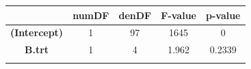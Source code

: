 \documentclass[]{article}
\begin{document}
\begin{longtable}[]{@{}ccccc@{}}
\toprule
\begin{minipage}[b]{0.29\columnwidth}\centering\strut
~\strut
\end{minipage} & \begin{minipage}[b]{0.10\columnwidth}\centering\strut
numDF\strut
\end{minipage} & \begin{minipage}[b]{0.10\columnwidth}\centering\strut
denDF\strut
\end{minipage} & \begin{minipage}[b]{0.12\columnwidth}\centering\strut
F-value\strut
\end{minipage} & \begin{minipage}[b]{0.12\columnwidth}\centering\strut
p-value\strut
\end{minipage}\tabularnewline
\midrule
\endhead
\begin{minipage}[t]{0.29\columnwidth}\centering\strut
\textbf{(Intercept)}\strut
\end{minipage} & \begin{minipage}[t]{0.10\columnwidth}\centering\strut
1\strut
\end{minipage} & \begin{minipage}[t]{0.10\columnwidth}\centering\strut
97\strut
\end{minipage} & \begin{minipage}[t]{0.12\columnwidth}\centering\strut
1645\strut
\end{minipage} & \begin{minipage}[t]{0.12\columnwidth}\centering\strut
0\strut
\end{minipage}\tabularnewline
\begin{minipage}[t]{0.29\columnwidth}\centering\strut
\textbf{B.trt}\strut
\end{minipage} & \begin{minipage}[t]{0.10\columnwidth}\centering\strut
1\strut
\end{minipage} & \begin{minipage}[t]{0.10\columnwidth}\centering\strut
4\strut
\end{minipage} & \begin{minipage}[t]{0.12\columnwidth}\centering\strut
1.962\strut
\end{minipage} & \begin{minipage}[t]{0.12\columnwidth}\centering\strut
0.2339\strut
\end{minipage}\tabularnewline
\begin{minipage}[t]{0.29\columnwidth}\centering\strut

\end{minipage}
\end{longtable}
\end{document}
